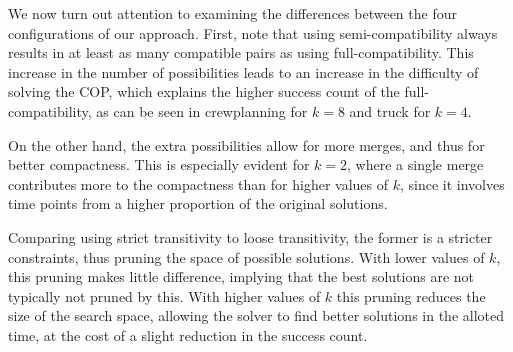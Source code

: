 We now turn out attention to examining the differences between the four configurations of our approach. First, note that using semi-compatibility always results in at least as many compatible pairs as using full-compatibility. 
This increase in the number of possibilities leads to an increase in the difficulty of solving the COP, which explains the higher success count of the full-compatibility, as can be seen in crewplanning for $k=8$ and truck for $k=4$.

On the other hand, the extra possibilities allow for more merges, and thus for better compactness. This is especially evident for $k=2$, where a single merge contributes more to the compactness than for higher values of $k$, since it involves time points from a higher proportion of the original solutions. 


Comparing using strict transitivity to loose transitivity, the former is a stricter constraints, thus pruning the space of possible solutions. With lower values of $k$, this pruning makes little difference, implying that the best solutions are not typically not pruned by this. With higher values of $k$ this pruning reduces the size of the search space, allowing the solver to find better solutions in the alloted time, at the cost of a slight reduction in the success count. 



